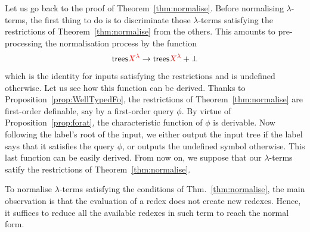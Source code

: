 \medskip

Let us go back to the proof of Theorem~\ref{thm:normalise}. Before normalising $\lambda$-terms, the first thing to do is to discriminate those $\lambda$-terms satisfying the restrictions of Theorem~\ref{thm:normalise} from the others. This amounts to pre-processing the normalisation process by the function
\begin{align*}
\mathsf {trees} {\color{red}{X^\lambda}} \to \mathsf {trees} {\color{red}{X^\lambda}} +\bot
\end{align*}
which is the identity for inputs satisfying the restrictions and is undefined otherwise. Let us see how this function can be derived. Thanks to Proposition~\ref{prop:WellTypedFo}, the restrictions of Theorem~\ref{thm:normalise} are first-order definable, say by a first-order query $\phi$. By virtue of Proposition~\ref{prop:forat}, the characteristic function of $\phi$ is derivable. Now following the label's root of the input, we either output the input tree if the label says that it satisfies the query $\phi$, or outputs the undefined symbol otherwise. This last function can be easily derived. From now on, we suppose that our $\lambda$-terms satify the restrictions of Theorem~\ref{thm:normalise}.  

To normalise $\lambda$-terms satisfying the conditions of Thm.~\ref{thm:normalise}, the main observation is that the evaluation of a redex does not create new redexes. Hence, it suffices to reduce all the available redexes in such term to reach the normal form. 



